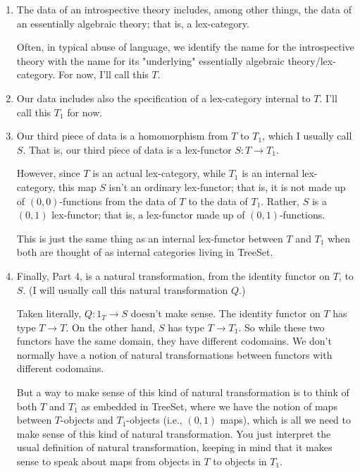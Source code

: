 \begin{enumerate}

\item
The data of an introspective theory includes, among other things, the data of an essentially algebraic theory; that is, a lex-category. 

Often, in typical abuse of language, we identify the name for the introspective theory with the name for its "underlying" essentially algebraic theory/lex-category. For now, I'll call this $T$. 

\item
Our data includes also the specification of a lex-category internal to $T$. I'll call this $T_1$ for now. 

\item
Our third piece of data is a homomorphism from $T$ to $T_1$, which I usually call $S$. That is, our third piece of data is a lex-functor $S : T \to T_1$.

However, since $T$ is an actual lex-category, while $T_1$ is an internal lex-category, this map $S$ isn't an ordinary lex-functor; that is, it is not made up of $(0, 0)$-functions from the data of $T$ to the data of $T_1$. Rather, $S$ is a $(0, 1)$ lex-functor; that is, a lex-functor made up of $(0, 1)$-functions.

This is just the same thing as an internal lex-functor between $T$ and $T_1$ when both are thought of as internal categories living in TreeSet.

\item
Finally, Part 4, is a natural transformation, from the identity functor on $T$, to $S$. (I will usually call this natural transformation $Q$.)

Taken literally, $Q : 1_T \to S$ doesn't make sense. The identity functor on $T$ has type $T \to T$. On the other hand, $S$ has type $T \to T_1$. So while these two functors have the same domain, they have different codomains. We don't normally have a notion of natural transformations between functors with different codomains.

But a way to make sense of this kind of natural transformation is to think of both $T$ and $T_1$ as embedded in TreeSet, where we have the notion of maps between $T$-objects and $T_1$-objects (i.e., $(0, 1)$ maps), which is all we need to make sense of this kind of natural transformation. You just interpret the usual definition of natural transformation, keeping in mind that it makes sense to speak about maps from objects in $T$ to objects in $T_1$.


\end{enumerate}
